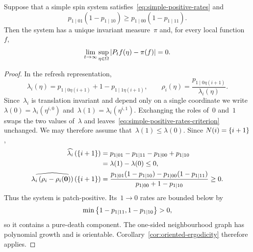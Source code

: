 \documentclass[EJP,preprint,NODS,nobera]{ejpecp}
\begin{document}
\begin{corollary}
\label{cor:simple-positive-rates}
Suppose that a simple spin system satisfies~\eqref{eq:simple-positive-rates}
and
\begin{equation}
\label{eq:simple-positive-rates-criterion}
p_{1\mid01}(1-p_{1\mid10})
\geq
p_{1\mid00}(1-p_{1\mid11}).
\end{equation}
Then the system has a unique invariant measure~$\pi$ and, for every local
function~$f$,
\begin{equation*}
\lim_{t\to\infty}
\sup_{\eta\in\Omega}
\left|P_tf(\eta)-\pi(f)\right|
=
0.
\end{equation*}
\end{corollary}

\begin{proof}
In the refresh representation,
\begin{equation*}
\lambda_i(\eta)
=
p_{1\mid0\eta(i+1)}+1-p_{1\mid1\eta(i+1)},
\qquad
\rho_i(\eta)
=
\frac{p_{1\mid0\eta(i+1)}}{\lambda_i(\eta)}.
\end{equation*}
Since~$\lambda_i$ is translation invariant and depend only on a single coordinate we write~$\lambda(0)=\lambda_i(\eta^{i,0})$ and~$\lambda(1)=\lambda_i(\eta^{i,1})$.  Exchanging the roles of~$0$ and~$1$ swaps the two values of~$\lambda$ and
leaves~\eqref{eq:simple-positive-rates-criterion} unchanged. We may therefore
assume that~$\lambda(1)\leq\lambda(0)$. Since
$N(i)=\left\{i+1\right\}$,
\begin{align*}
\widehat{\lambda_i}\left(\left\{i+1\right\}\right)
&=
p_{1\mid01}-p_{1\mid11}-p_{1\mid00}+p_{1\mid10}\\
&= \lambda(1)-\lambda(0)
\leq0,\\
\widehat{\lambda_i\left(\rho_i-\rho_i(\mathbf{0})\right)}\left(\left\{i+1\right\}\right)
&=
\frac{
p_{1\mid01}(1-p_{1\mid10})
-
p_{1\mid00}(1-p_{1\mid11})
}{
p_{1\mid00}+1-p_{1\mid10}
}
\geq0.
\end{align*}
Thus the system is patch-positive. Its~$1\to0$ rates are bounded below by
\begin{equation*}
\min\left\{1-p_{1\mid11},1-p_{1\mid10}\right\}>0,
\end{equation*}
so it contains a pure-death component. The one-sided neighbourhood graph has
polynomial growth and is orientable. Corollary~\ref{cor:oriented-ergodicity}
therefore applies.
\end{proof}
\end{document}
